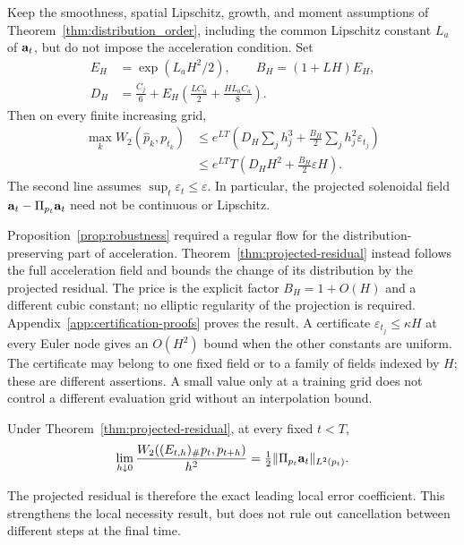 \begin{theorem}
\label{thm:projected-residual}
Keep the smoothness, spatial Lipschitz, growth, and moment assumptions of
Theorem~\ref{thm:distribution_order}, including the common Lipschitz constant
$L_a$ of $\mathbf a_t$, but do not impose the acceleration condition.  Set
\begin{align}
 E_H&=\exp(L_aH^2/2),\qquad B_H=(1+LH)E_H,\nonumber\\
 D_H&=\frac{C_j}{6}+E_H\left(\frac{LC_a}{2}
                         +\frac{HL_aC_a}{8}\right).
 \label{eq:projected-constants}
\end{align}
Then on every finite increasing grid,
\begin{align}
 \max_k W_2(\widehat p_k,p_{t_k})
 &\le e^{LT}\left(D_H\sum_jh_j^3
                   +\frac{B_H}{2}\sum_jh_j^2\varepsilon_{t_j}\right)
 \label{eq:projected-bound}\\
 &\le e^{LT}T\left(D_HH^2+\frac{B_H}{2}\varepsilon H\right)
 .\nonumber
\end{align}
The second line assumes $\sup_t\varepsilon_t\le\varepsilon$.
In particular, the projected solenoidal field
$\mathbf a_t-\Pi_{p_t}\mathbf a_t$ need not be continuous or Lipschitz.
\end{theorem}

Proposition~\ref{prop:robustness} required a regular flow for the
distribution-preserving part of acceleration.  Theorem~\ref{thm:projected-residual}
instead follows the full acceleration field and bounds the change of its
distribution by the projected residual.  The price is the explicit factor
$B_H=1+O(H)$ and a different cubic constant; no elliptic regularity of the
projection is required.  Appendix~\ref{app:certification-proofs} proves the
result.  A certificate $\varepsilon_{t_j}\le\kappa H$ at every Euler node
gives an $O(H^2)$ bound when the other constants are uniform.  The certificate
may belong to one fixed field or to a family of fields indexed by $H$; these
are different assertions.  A small value only at a training grid does not
control a different evaluation grid without an interpolation bound.

\begin{corollary}
\label{cor:sharp-local-residual}
Under Theorem~\ref{thm:projected-residual}, at every fixed $t<T$,
\begin{equation}
 \lim_{h\downarrow0}\frac{W_2((E_{t,h})_\#p_t,p_{t+h})}{h^2}
 =\tfrac12\|\Pi_{p_t}\mathbf a_t\|_{L^2(p_t)}.
 \label{eq:sharp-local-residual}
\end{equation}
\end{corollary}
The projected residual is therefore the exact leading local error
coefficient.  This strengthens the local necessity result, but does not
rule out cancellation between different steps at the final time.

